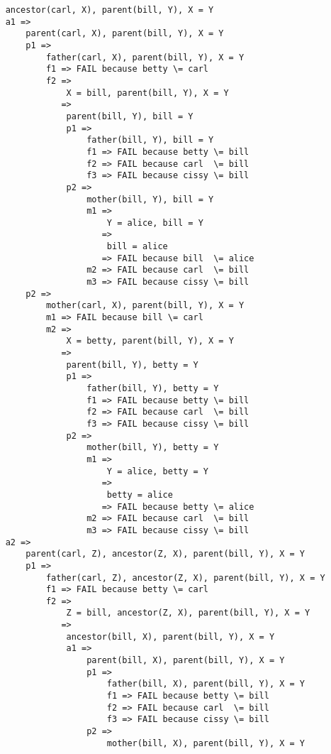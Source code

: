 \documentclass[a4paper,11pt,notitlepage,onecolumn]{article}
\begin{document}
\begin{verbatim}
    ancestor(carl, X), parent(bill, Y), X = Y
    a1 =>
        parent(carl, X), parent(bill, Y), X = Y
        p1 =>
            father(carl, X), parent(bill, Y), X = Y
            f1 => FAIL because betty \= carl
            f2 =>
                X = bill, parent(bill, Y), X = Y
               =>
                parent(bill, Y), bill = Y
                p1 =>
                    father(bill, Y), bill = Y
                    f1 => FAIL because betty \= bill
                    f2 => FAIL because carl  \= bill
                    f3 => FAIL because cissy \= bill
                p2 =>
                    mother(bill, Y), bill = Y
                    m1 =>
                        Y = alice, bill = Y
                       =>
                        bill = alice
                       => FAIL because bill  \= alice
                    m2 => FAIL because carl  \= bill
                    m3 => FAIL because cissy \= bill
        p2 =>
            mother(carl, X), parent(bill, Y), X = Y
            m1 => FAIL because bill \= carl
            m2 =>
                X = betty, parent(bill, Y), X = Y
               =>
                parent(bill, Y), betty = Y
                p1 =>
                    father(bill, Y), betty = Y
                    f1 => FAIL because betty \= bill
                    f2 => FAIL because carl  \= bill
                    f3 => FAIL because cissy \= bill
                p2 =>
                    mother(bill, Y), betty = Y
                    m1 =>
                        Y = alice, betty = Y
                       =>
                        betty = alice
                       => FAIL because betty \= alice
                    m2 => FAIL because carl  \= bill
                    m3 => FAIL because cissy \= bill
    a2 =>
        parent(carl, Z), ancestor(Z, X), parent(bill, Y), X = Y
        p1 =>
            father(carl, Z), ancestor(Z, X), parent(bill, Y), X = Y
            f1 => FAIL because betty \= carl
            f2 =>
                Z = bill, ancestor(Z, X), parent(bill, Y), X = Y
               =>
                ancestor(bill, X), parent(bill, Y), X = Y
                a1 =>
                    parent(bill, X), parent(bill, Y), X = Y
                    p1 =>
                        father(bill, X), parent(bill, Y), X = Y
                        f1 => FAIL because betty \= bill
                        f2 => FAIL because carl  \= bill
                        f3 => FAIL because cissy \= bill
                    p2 =>
                        mother(bill, X), parent(bill, Y), X = Y

\end{verbatim}
\end{document}
